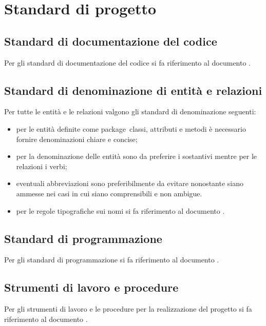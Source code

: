 \documentclass[../DefinizioneDiProdotto.tex]{subfiles}
\begin{document}
\section{Standard di progetto}

	\subsection{Standard di documentazione del codice}
		Per gli standard di documentazione del codice si fa riferimento al documento \normediprogettov.

	\subsection{Standard di denominazione di entità e relazioni}
		Per tutte le entità e le relazioni valgono gli standard di denominazione seguenti:
		\begin{itemize}
			\item per le entità definite come package\g\, classi, attributi e metodi è necessario fornire denominazioni chiare e concise;
			\item per la denominazione delle entità sono da preferire i sostantivi mentre per le relazioni i verbi;
			\item eventuali abbreviazioni sono preferibilmente da evitare nonostante siano ammesse nei casi in cui siano comprensibili e non ambigue.
			\item per le regole tipografiche sui nomi si fa riferimento al documento \normediprogettov.
		\end{itemize}	
		

	\subsection{Standard di programmazione}
		Per gli standard di programmazione si fa riferimento al documento \normediprogettov.

	\subsection{Strumenti di lavoro e procedure}
		Per gli strumenti di lavoro e le procedure per la realizzazione del progetto si fa riferimento al documento \normediprogettov.
	
\end{document}
